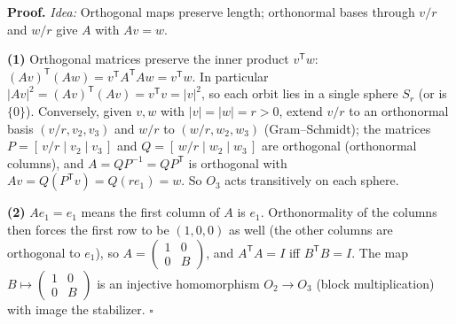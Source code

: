 \documentclass[11pt]{report}
\renewenvironment{proof}[1][Proof]{\noindent\textbf{#1.} }{\hfill$\square$\par\vspace{5pt}}
\begin{document}
\begin{proof}
\textit{Idea:} Orthogonal maps preserve length; orthonormal bases through $v/r$ and $w/r$ give $A$ with $Av = w$.\par
\textbf{(1)} Orthogonal matrices preserve the inner product $v^{\mathsf{T}}w$: $(Av)^{\mathsf{T}}(Aw) = v^{\mathsf{T}}A^{\mathsf{T}}Aw = v^{\mathsf{T}}w$. In particular $|Av|^2 = (Av)^{\mathsf{T}}(Av) = v^{\mathsf{T}}v = |v|^2$, so each orbit lies in a single sphere $S_r$ (or is $\{0\}$). Conversely, given $v, w$ with $|v| = |w| = r > 0$, extend $v/r$ to an orthonormal basis $(v/r, v_2, v_3)$ and $w/r$ to $(w/r, w_2, w_3)$ (Gram--Schmidt); the matrices $P = [\,v/r \mid v_2 \mid v_3\,]$ and $Q = [\,w/r \mid w_2 \mid w_3\,]$ are orthogonal (orthonormal columns), and $A = QP^{-1} = QP^{\mathsf{T}}$ is orthogonal with $Av = Q(P^{\mathsf{T}}v) = Q(re_1) = w$. So $O_3$ acts transitively on each sphere.

\textbf{(2)} $Ae_1 = e_1$ means the first column of $A$ is $e_1$. Orthonormality of the columns then forces the first row to be $(1, 0, 0)$ as well (the other columns are orthogonal to $e_1$), so $A = \begin{pmatrix} 1 & 0 \\ 0 & B \end{pmatrix}$, and $A^{\mathsf{T}}A = I$ iff $B^{\mathsf{T}}B = I$. The map $B \mapsto \begin{pmatrix} 1 & 0 \\ 0 & B \end{pmatrix}$ is an injective homomorphism $O_2 \to O_3$ (block multiplication) with image the stabilizer.
\end{proof}
\end{document}
